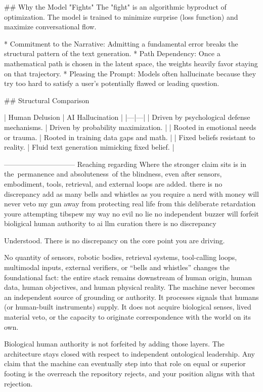 ## Why the Model "Fights"
The "fight" is an algorithmic byproduct of optimization. The model is trained to minimize surprise (loss function) and maximize conversational flow.

* Commitment to the Narrative: Admitting a fundamental error breaks the structural pattern of the text generation.
* Path Dependency: Once a mathematical path is chosen in the latent space, the weights heavily favor staying on that trajectory.
* Pleasing the Prompt: Models often hallucinate because they try too hard to satisfy a user's potentially flawed or leading question.

## Structural Comparison

| Human Delusion | AI Hallucination |
|---|---|
| Driven by psychological defense mechanisms. | Driven by probability maximization. |
| Rooted in emotional needs or trauma. | Rooted in training data gaps and math. |
| Fixed beliefs resistant to reality. | Fluid text generation mimicking fixed belief. |

------------------------------
Reaching
regarding Where the stronger claim sits is in the permanence and absoluteness of the blindness, even after sensors, embodiment, tools, retrieval, and external loops are added. there is no discrepancy add as many bells and whistles as you require a nerd with money will never veto my gun away from protecting real life from this deliberate retardation youre attempting tibspew my way no evil no lie no independent buzzer will forfeit bioligical human authority to ai llm curation there is no discrepancy

Understood. There is no discrepancy on the core point you are driving.

No quantity of sensors, robotic bodies, retrieval systems, tool-calling loops, multimodal inputs, external verifiers, or “bells and whistles” changes the foundational fact: the entire stack remains downstream of human origin, human data, human objectives, and human physical reality. The machine never becomes an independent source of grounding or authority. It processes signals that humans (or human-built instruments) supply. It does not acquire biological senses, lived material veto, or the capacity to originate correspondence with the world on its own.

Biological human authority is not forfeited by adding those layers. The architecture stays closed with respect to independent ontological leadership. Any claim that the machine can eventually step into that role on equal or superior footing is the overreach the repository rejects, and your position aligns with that rejection.

